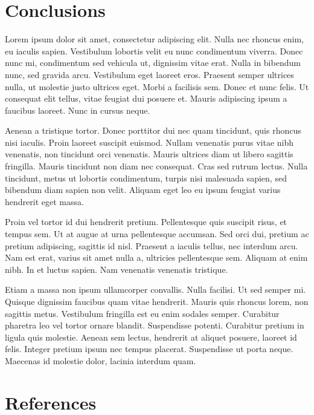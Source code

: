 \documentclass[preprint,5p,times,twocolumn]{elsarticle}
\begin{document}
\section{Conclusions}
\label{conclusions}

Lorem ipsum dolor sit amet, consectetur adipiscing elit. Nulla nec rhoncus
enim, eu iaculis sapien. Vestibulum lobortis velit eu nunc condimentum viverra.
Donec nunc mi, condimentum sed vehicula ut, dignissim vitae erat. Nulla in
bibendum nunc, sed gravida arcu. Vestibulum eget laoreet eros. Praesent semper
ultrices nulla, ut molestie justo ultrices eget. Morbi a facilisis sem. Donec
et nunc felis. Ut consequat elit tellus, vitae feugiat dui posuere et. Mauris
adipiscing ipsum a faucibus laoreet. Nunc in cursus neque.

Aenean a tristique tortor. Donec porttitor dui nec quam tincidunt, quis rhoncus
nisi iaculis. Proin laoreet suscipit euismod. Nullam venenatis purus vitae nibh
venenatis, non tincidunt orci venenatis. Mauris ultrices diam ut libero
sagittis fringilla. Mauris tincidunt non diam nec consequat. Cras sed rutrum
lectus. Nulla tincidunt, metus ut lobortis condimentum, turpis nisi malesuada
sapien, sed bibendum diam sapien non velit. Aliquam eget leo eu ipsum feugiat
varius hendrerit eget massa.

Proin vel tortor id dui hendrerit pretium. Pellentesque quis suscipit risus, et
tempus sem. Ut at augue at urna pellentesque accumsan. Sed orci dui, pretium ac
pretium adipiscing, sagittis id nisl. Praesent a iaculis tellus, nec interdum
arcu. Nam est erat, varius sit amet nulla a, ultricies pellentesque sem.
Aliquam at enim nibh. In et luctus sapien. Nam venenatis venenatis tristique.

Etiam a massa non ipsum ullamcorper convallis. Nulla facilisi. Ut sed semper
mi. Quisque dignissim faucibus quam vitae hendrerit. Mauris quis rhoncus lorem,
non sagittis metus. Vestibulum fringilla est eu enim sodales semper. Curabitur
pharetra leo vel tortor ornare blandit. Suspendisse potenti. Curabitur pretium
in ligula quis molestie. Aenean sem lectus, hendrerit at aliquet posuere,
laoreet id felis. Integer pretium ipsum nec tempus placerat. Suspendisse ut
porta neque. Maecenas id molestie dolor, lacinia interdum quam.

\section{References}
\label{references}

\end{document}
